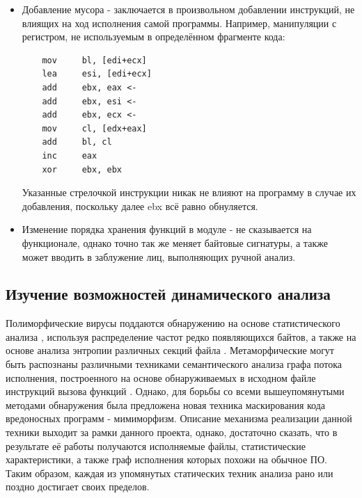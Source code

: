 \begin {itemize}
Пример:
	\begin{lstlisting}
	call    lstrcmpA
	jnz     short loc_4012D4
	push    40h; 1
	push    offset aCaption; 1
	push    offset aRightAnswer; 1
	push    [ebp+hWnd]; 1
	call    MessageBoxA; 1
	jmp     short loc_4012E8
loc_4012D4:
	push    10h; 2
	push    offset aCaption; 2
	push    offset aWrongAnswer; 2
	push    [ebp+hWnd]; 2
	call    MessageBoxA; 2
loc_4012E8:
	call    ExitProcess
	\end{lstlisting}
	Замена первоначальной инструкции jnz на jz (переход в случае неравенства на переход в случае равенства) и перестановка местами блоков, помеченных как 1 и 2 не меняет смысловую нагрузку, выполняемую программой, однако позволяет значительно поменять её структуру. Это создаёт значительные трудности как в случае автоматического, так и ручного исследования, если таковых замен произведено значительное количество.
	\item Добавление мусора - заключается в произвольном добавлении инструкций, не влиящих на ход исполнения самой программы. Например, манипуляции с регистром, не используемым в определённом фрагменте кода:
	\begin{lstlisting}
	mov     bl, [edi+ecx]
	lea     esi, [edi+ecx]
	add     ebx, eax <-
	add     ebx, esi <-
	add     ebx, ecx <-
	mov     cl, [edx+eax]
	add     bl, cl
	inc     eax
	xor     ebx, ebx
	\end{lstlisting}
	Указанные стрелочкой инструкции никак не влияют на программу в случае их добавления, поскольку далее ebx всё равно обнуляется.
	\item Изменение порядка хранения функций в модуле - не сказывается на функционале, однако точно так же меняет байтовые сигнатуры, а также может вводить в заблужение лиц, выполняющих ручной анализ.
\end {itemize}

\subsection{Изучение возможностей динамического анализа}
Полиморфические вирусы поддаются обнаружению на основе статистического анализа \cite{PAYLOADDETECTION, ANAGRAM}, используя распределение частот редко появляющихся байтов, а также на основе анализа энтропии различных секций файла \cite{ENTROPYANALYSIS}. Метаморфические могут быть распознаны различными техниками семантического анализа графа потока исполнения, построенного на основе обнаруживаемых в исходном файле инструкций вызова функций \cite{METAAWARE}. Однако, для борьбы со всеми вышеупомянутыми методами обнаружения была предложена новая техника маскирования кода вредоносных программ - мимиморфизм\cite{MIMIMORPHISM}. Описание механизма реализации данной техники выходит за рамки данного проекта, однако, достаточно сказать, что в результате её работы получаются исполняемые файлы, статистические характеристики, а также граф исполнения которых похожи на обычное ПО. Таким образом, каждая из упомянутых статических техник анализа рано или поздно достигает своих пределов.

